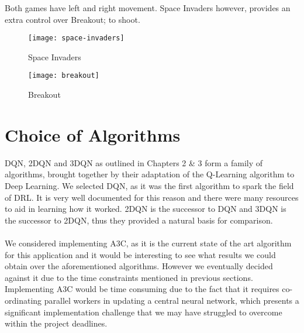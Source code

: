 Both games have left and right movement. Space Invaders however, provides an extra control over Breakout; to shoot.

\begin{figure}[h]
    \begin{minipage}[c]{0.4\textwidth}
        \texttt{[image: space-invaders]}
        \caption{Space Invaders}
        \label{fig:space_invaders}
    \end{minipage}
    \hfill
    \begin{minipage}[c]{0.4\textwidth}
        \texttt{[image: breakout]}
        \caption{Breakout}
        \label{fig:breakout}
    \end{minipage}
\end{figure}

\section{Choice of Algorithms}
DQN, 2DQN and 3DQN as outlined in Chapters 2 \& 3 form a family of algorithms, brought together by their adaptation of the Q-Learning algorithm to Deep Learning. We selected DQN, as it was the first algorithm to spark the field of DRL. It is very well documented for this reason and there were many resources to aid in learning how it worked. 2DQN is the successor to DQN and 3DQN is the successor to 2DQN, thus they provided a natural basis for comparison. \paragraph{}

We considered implementing A3C, as it is the current state of the art algorithm for this application and it would be interesting to see what results we could obtain over the aforementioned algorithms. However we eventually decided against it due to the time constraints mentioned in previous sections. Implementing A3C would be time consuming due to the fact that it requires co-ordinating parallel workers in updating a central neural network, which presents a significant implementation challenge that we may have struggled to overcome within the project deadlines.
